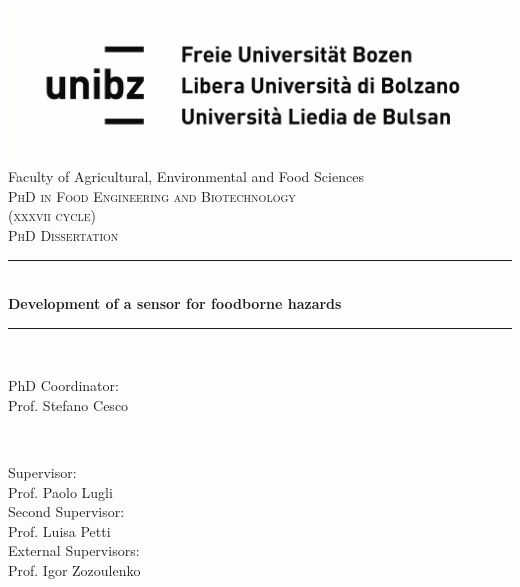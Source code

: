 \thispagestyle{empty}
\begin{titlepage}

\begin{center}

\includegraphics[scale=0.6]{Figures/unibz_logo.jpg} 
\\[3 mm]
Faculty of Agricultural, Environmental and Food Sciences \\
\textsc{\Large PhD in Food Engineering and Biotechnology}
\\[1 mm]
\textsc{(xxxvii cycle)}
\\[6 mm]
%
%
\textsc{PhD Dissertation}
\rule{\linewidth}{0.3mm}
\\[4 mm]
{\LARGE \textbf{Development of a sensor for foodborne hazards}}
\\[5 mm]
\rule{\linewidth}{0.3mm}
\\[7 mm]
%
\begin{minipage}{0.49\textwidth}
\begin{flushleft} 
\large
PhD Coordinator:
\\[1 mm]
Prof. Stefano Cesco
\end{flushleft}
\end{minipage}
%
%
\begin{minipage}{0.49\textwidth}
\begin{flushright}
\large

\end{flushright}
\end{minipage}
%
\\[6 mm]
\begin{minipage}{0.98\textwidth}
\begin{flushleft}
\large
Supervisor:
\\[1 mm]
Prof. Paolo Lugli
\\[4 mm]
Second Supervisor:
\\[1 mm]
Prof. Luisa Petti
\\[4 mm]
External Supervisors:
\\[1 mm]
Prof. Igor Zozoulenko
\\[4 mm]


\end{flushleft}
\end{minipage}
\end{center}
\end{titlepage}
